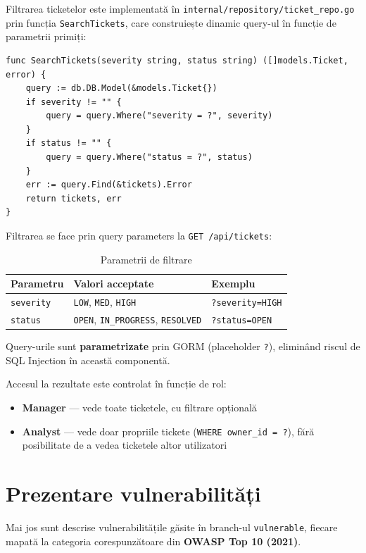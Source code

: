 \documentclass[12pt]{article}
\begin{document}
Filtrarea ticketelor este implementată în \texttt{internal/repository/ticket\_repo.go}
prin funcția \texttt{SearchTickets}, care construiește dinamic query-ul în funcție de
parametrii primiți:

\begin{verbatim}
func SearchTickets(severity string, status string) ([]models.Ticket, error) {
    query := db.DB.Model(&models.Ticket{})
    if severity != "" {
        query = query.Where("severity = ?", severity)
    }
    if status != "" {
        query = query.Where("status = ?", status)
    }
    err := query.Find(&tickets).Error
    return tickets, err
}
\end{verbatim}

Filtrarea se face prin query parameters la \texttt{GET /api/tickets}:

\begin{table}[H]
\centering
\begin{tabular}{|l|l|l|}
\hline
\textbf{Parametru} & \textbf{Valori acceptate} & \textbf{Exemplu} \\
\hline
\texttt{severity} & \texttt{LOW}, \texttt{MED}, \texttt{HIGH} & \texttt{?severity=HIGH} \\
\texttt{status}   & \texttt{OPEN}, \texttt{IN\_PROGRESS}, \texttt{RESOLVED} & \texttt{?status=OPEN} \\
\hline
\end{tabular}
\caption{Parametrii de filtrare}
\end{table}

Query-urile sunt \textbf{parametrizate} prin GORM (placeholder \texttt{?}), eliminând
riscul de SQL Injection în această componentă.

Accesul la rezultate este controlat în funcție de rol:
\begin{itemize}
    \item \textbf{Manager} --- vede toate ticketele, cu filtrare opțională
    \item \textbf{Analyst} --- vede doar propriile tickete (\texttt{WHERE owner\_id = ?}),
    fără posibilitate de a vedea ticketele altor utilizatori
\end{itemize}

\newpage
\section{Prezentare vulnerabilități}

Mai jos sunt descrise vulnerabilitățile găsite în branch-ul \texttt{vulnerable}, fiecare
mapată la categoria corespunzătoare din \textbf{OWASP Top 10 (2021)}.
\end{document}
